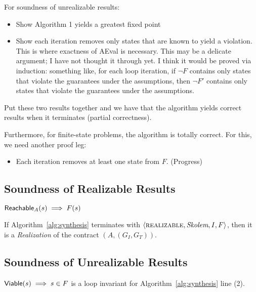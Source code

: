 For soundness of unrealizable results:
\begin{itemize}
    \item Show Algorithm 1 yields a greatest fixed point
    \item Show each iteration removes only states that are known to yield a violation.  This is where exactness of AEval is necessary.  This may be a delicate argument; I have not thought it through yet.  I think it would be proved via induction: something like, for each loop iteration, if $\lnot F$ contains only
        states that violate the guarantees under the assumptions, then $\lnot F'$ contains only states that violate the guarantees under the assumptions.
\end{itemize}

Put these two results together and we have that the algorithm yields correct results when it terminates (partial correctness).

Furthermore, for finite-state problems, the algorithm is totally correct.  For this, we need another proof leg:
\begin{itemize}
    \item Each iteration removes at least one state from $F$.  (Progress)
\end{itemize}


\subsection{Soundness of Realizable Results}


\begin{lemma} ${\mathsf {Reachable}}_A(s) \implies F(s)$
\end{lemma}

\begin{theorem} If Algorithm~\ref{alg:synthesis} terminates with $\langle \textsc{realizable}, \textit{Skolem}, I, F \rangle$, then it is a {\em Realization} of the contract $(A, (G_{I}, G_{T}))$.
\end{theorem}


\subsection{Soundness of Unrealizable Results}


\begin{lemma}
${\mathsf {Viable}}(s) \implies s \in F$ is a loop invariant for Algorithm~\ref{alg:synthesis} line (2).
\label{lem:alg1-viable}
\end{lemma}

